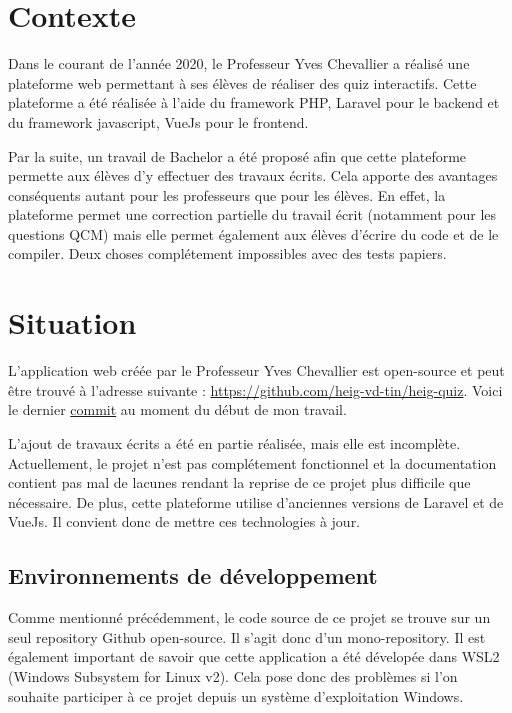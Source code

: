 
\section{Contexte}
Dans le courant de l'année 2020, le Professeur Yves Chevallier a réalisé une plateforme web permettant à ses élèves de réaliser des quiz interactifs. Cette plateforme a été réalisée à l'aide du framework PHP, Laravel pour le backend et du framework javascript, VueJs pour le frontend.

Par la suite, un travail de Bachelor a été proposé afin que cette plateforme permette aux élèves d'y effectuer des travaux écrits. Cela apporte des avantages conséquents autant pour les professeurs que pour les élèves. En effet, la plateforme permet une correction partielle du travail écrit (notamment pour les questions QCM) mais elle permet également aux élèves d'écrire du code et de le compiler. Deux choses complétement impossibles avec des tests papiers.


\section{Situation}
L'application web créée par le Professeur Yves Chevallier est open-source et peut être trouvé à l'adresse suivante : \url{https://github.com/heig-vd-tin/heig-quiz}. Voici le dernier \href{https://github.com/heig-vd-tin/heig-quiz/commit/28fb1ac5367931f6aa986041fb992c651c9816cd}{commit} au moment du début de mon travail.

L'ajout de travaux écrits a été en partie réalisée, mais elle est incomplète. Actuellement, le projet n'est pas complétement fonctionnel et la documentation contient pas mal de lacunes rendant la reprise de ce projet plus difficile que nécessaire. De plus, cette plateforme utilise d'anciennes versions de Laravel et de VueJs. Il convient donc de mettre ces technologies à jour.

\subsection{Environnements de développement}
Comme mentionné précédemment, le code source de ce projet se trouve sur un seul repository Github open-source. Il s'agit donc d'un mono-repository. Il est également important de savoir que cette application a été dévelopée dans WSL2 (Windows Subsystem for Linux v2). Cela pose donc des problèmes si l'on souhaite participer à ce projet depuis un système d'exploitation Windows.

